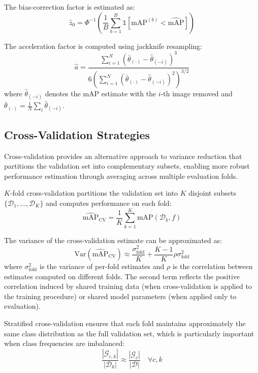 The bias-correction factor is estimated as:
\begin{equation}
\hat{z}_0 = \Phi^{-1}\left( \frac{1}{B} \sum_{b=1}^{B} \mathbb{1}[\text{mAP}^{(b)} < \widehat{\text{mAP}}] \right)
\label{eq:bias_correction}
\end{equation}

The acceleration factor is computed using jackknife resampling:
\begin{equation}
\hat{a} = \frac{\sum_{i=1}^{N} (\bar{\theta}_{(\cdot)} - \hat{\theta}_{(-i)})^3}{6 \left( \sum_{i=1}^{N} (\bar{\theta}_{(\cdot)} - \hat{\theta}_{(-i)})^2 \right)^{3/2}}
\label{eq:acceleration_factor}
\end{equation}
where $\hat{\theta}_{(-i)}$ denotes the mAP estimate with the $i$-th image removed and $\bar{\theta}_{(\cdot)} = \frac{1}{N} \sum_i \hat{\theta}_{(-i)}$.

\subsection{Cross-Validation Strategies}

Cross-validation provides an alternative approach to variance reduction that partitions the validation set into complementary subsets, enabling more robust performance estimation through averaging across multiple evaluation folds.

$K$-fold cross-validation partitions the validation set into $K$ disjoint subsets $\{\mathcal{D}_1, \ldots, \mathcal{D}_K\}$ and computes performance on each fold:
\begin{equation}
\widehat{\text{mAP}}_{\text{CV}} = \frac{1}{K} \sum_{k=1}^{K} \text{mAP}(\mathcal{D}_k, f)
\label{eq:cv_estimate}
\end{equation}

The variance of the cross-validation estimate can be approximated as:
\begin{equation}
\text{Var}(\widehat{\text{mAP}}_{\text{CV}}) \approx \frac{\sigma^2_{\text{fold}}}{K} + \frac{K-1}{K} \rho \sigma^2_{\text{fold}}
\label{eq:cv_variance}
\end{equation}
where $\sigma^2_{\text{fold}}$ is the variance of per-fold estimates and $\rho$ is the correlation between estimates computed on different folds. The second term reflects the positive correlation induced by shared training data (when cross-validation is applied to the training procedure) or shared model parameters (when applied only to evaluation).

Stratified cross-validation ensures that each fold maintains approximately the same class distribution as the full validation set, which is particularly important when class frequencies are imbalanced:
\begin{equation}
\frac{|\mathcal{G}_{c,k}|}{|\mathcal{D}_k|} \approx \frac{|\mathcal{G}_c|}{|\mathcal{D}|} \quad \forall c, k
\label{eq:stratified_cv}
\end{equation}

